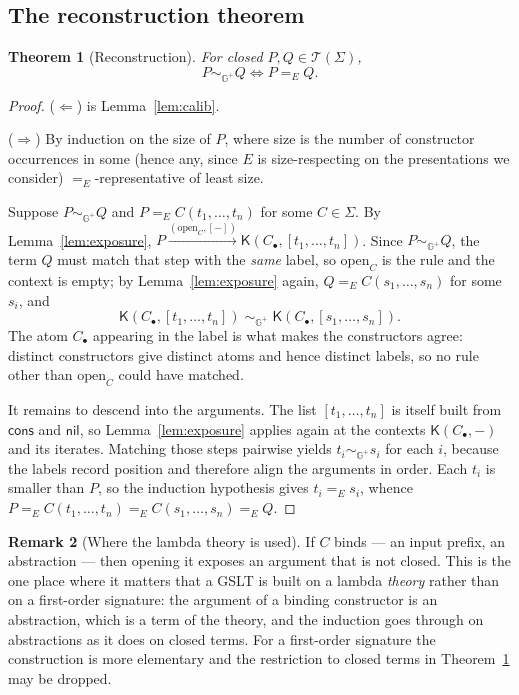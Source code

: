 \documentclass[11pt]{article}
\theoremstyle{plain}
\newtheorem{theorem}{Theorem}
\theoremstyle{definition}
\newtheorem{remark}[theorem]{Remark}
\newcommand{\Kc}{\mathsf{K}}
\newcommand{\Gg}{\mathbb{G}}
\newcommand{\op}{\mathrm{open}}
\newcommand{\bis}{\sim}
\newcommand{\Terms}{\mathcal{T}}
\begin{document}
\subsection{The reconstruction theorem}

\begin{theorem}[Reconstruction]
\label{thm:main}
For closed $P, Q \in \Terms(\Sigma)$,
\[
P \bis_{\Gg^+} Q \iff P =_E Q .
\]
\end{theorem}

\begin{proof}
($\Leftarrow$) is Lemma~\ref{lem:calib}.

($\Rightarrow$) By induction on the size of $P$, where size is the number of constructor occurrences
in some (hence any, since $E$ is size-respecting on the presentations we consider) $=_E$-representative
of least size.

Suppose $P \bis_{\Gg^+} Q$ and $P =_E C(t_1,\dots,t_n)$ for some $C \in \Sigma$. By
Lemma~\ref{lem:exposure}, $P \xrightarrow{(\op_C, [-])} \Kc(C_\bullet, [t_1,\dots,t_n])$. Since
$P \bis_{\Gg^+} Q$, the term $Q$ must match that step with the \emph{same} label, so $\op_C$ is the
rule and the context is empty; by Lemma~\ref{lem:exposure} again, $Q =_E C(s_1,\dots,s_n)$ for some
$s_i$, and
\[
\Kc(C_\bullet, [t_1,\dots,t_n]) \;\bis_{\Gg^+}\; \Kc(C_\bullet, [s_1,\dots,s_n]).
\]
The atom $C_\bullet$ appearing in the label is what makes the constructors agree: distinct
constructors give distinct atoms and hence distinct labels, so no rule other than $\op_C$ could have
matched.

It remains to descend into the arguments. The list $[t_1,\dots,t_n]$ is itself built from
$\mathsf{cons}$ and $\mathsf{nil}$, so Lemma~\ref{lem:exposure} applies again at the contexts
$\Kc(C_\bullet, -)$ and its iterates. Matching those steps pairwise yields
$t_i \bis_{\Gg^+} s_i$ for each $i$, because the labels record position and therefore align the
arguments in order. Each $t_i$ is smaller than $P$, so the induction hypothesis gives $t_i =_E s_i$,
whence $P =_E C(t_1,\dots,t_n) =_E C(s_1,\dots,s_n) =_E Q$.
\end{proof}

\begin{remark}[Where the lambda theory is used]
If $C$ binds --- an input prefix, an abstraction --- then opening it exposes an argument that is not
closed. This is the one place where it matters that a GSLT is built on a lambda \emph{theory} rather
than on a first-order signature: the argument of a binding constructor is an abstraction, which is a
term of the theory, and the induction goes through on abstractions as it does on closed terms. For a
first-order signature the construction is more elementary and the restriction to closed terms in
Theorem~\ref{thm:main} may be dropped.
\end{remark}
\end{document}
